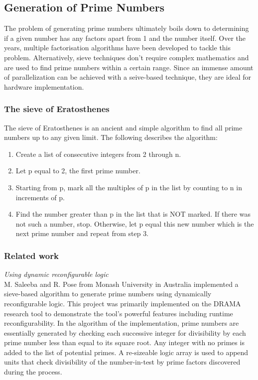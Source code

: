 \documentclass[journal]{IEEEtran}
\begin{document}
\subsection{Generation of Prime Numbers}
The problem of generating prime numbers ultimately boils down to determining if a given number has any factors apart from 1 and the number itself. Over the years, multiple factorisation algorithms have been developed to tackle this problem. Alternatively, sieve techniques don't require complex mathematics and are used to find prime numbers within a certain range. Since an immense amount of parallelization can be achieved with a seive-based technique, they are ideal for hardware implementation.

\subsubsection{The sieve of Eratosthenes}
The sieve of Eratosthenes is an ancient and simple algorithm to find all prime numbers up to any given limit. The following describes the algorithm: \\

\begin{enumerate}

	\item Create a list of consecutive integers from 2 through n.
	\item Let p equal to 2, the first prime number.
	\item Starting from p, mark all the multiples of p in the list by counting to n in increments of p.
	\item Find the number greater than p in the list that is NOT marked. If there was not such a number, stop. Otherwise, let p equal this new number which is the next prime number and repeat from step 3. \\

\end{enumerate} 

\subsubsection{Related work}

\textit{Using dynamic reconfigurable logic}\\
M. Saleeba and R. Pose from Monash University in Australia implemented a sieve-based algorithm to generate prime numbers using dynamically reconfigurable logic\cite{ausPrime}. This project was primarily implemented on the DRAMA research tool to demonstrate the tool's powerful features including runtime reconfigurability. In the algorithm of the implementation, prime numbers are essentially generated by checking each successive integer for divisibility by each prime number less than equal to its square root. Any integer with no primes is added to the list of potential primes. A re-sizeable logic array is used to append units that check divisibility of the number-in-test by prime factors discovered during the process.\\
\end{document}
